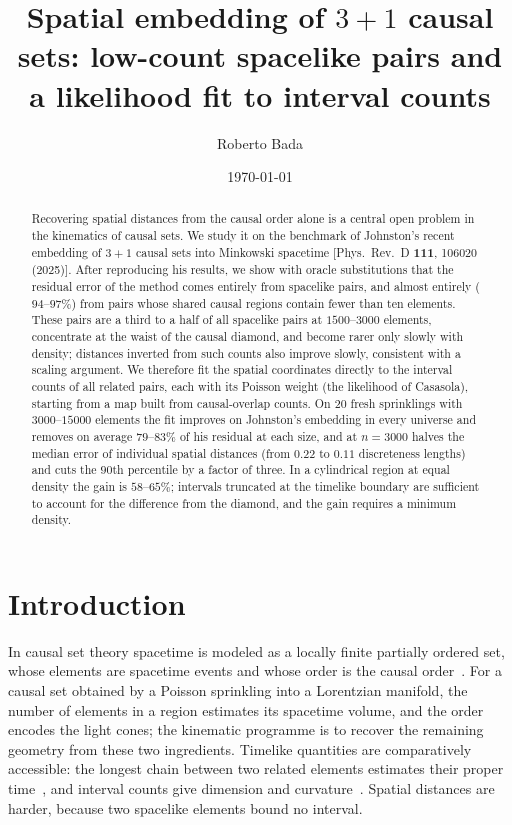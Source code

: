 \documentclass[prd,twocolumn,superscriptaddress,nofootinbib,amsmath,amssymb,floatfix]{revtex4-2}
\begin{document}
\title{Spatial embedding of $3+1$ causal sets: low-count spacelike pairs and a likelihood fit to interval counts}

\author{Roberto Bada}

\date{\today}

\begin{abstract}
Recovering spatial distances from the causal order alone is a central open problem in the kinematics of causal sets. We study it on the benchmark of Johnston's recent embedding of $3+1$ causal sets into Minkowski spacetime [Phys.\ Rev.\ D \textbf{111}, 106020 (2025)]. After reproducing his results, we show with oracle substitutions that the residual error of the method comes entirely from spacelike pairs, and almost entirely ($94$--$97\%$) from pairs whose shared causal regions contain fewer than ten elements. These pairs are a third to a half of all spacelike pairs at $1500$--$3000$ elements, concentrate at the waist of the causal diamond, and become rarer only slowly with density; distances inverted from such counts also improve slowly, consistent with a scaling argument. We therefore fit the spatial coordinates directly to the interval counts of all related pairs, each with its Poisson weight (the likelihood of Casasola), starting from a map built from causal-overlap counts. On 20 fresh sprinklings with $3000$--$15000$ elements the fit improves on Johnston's embedding in every universe and removes on average $79$--$83\%$ of his residual at each size, and at $n=3000$ halves the median error of individual spatial distances (from $0.22$ to $0.11$ discreteness lengths) and cuts the $90$th percentile by a factor of three. In a cylindrical region at equal density the gain is $58$--$65\%$; intervals truncated at the timelike boundary are sufficient to account for the difference from the diamond, and the gain requires a minimum density.
\end{abstract}

\maketitle

\section{Introduction}\label{sec:intro}
In causal set theory spacetime is modeled as a locally finite partially ordered set, whose elements are spacetime events and whose order is the causal order~\cite{BLMS87,Surya19}. For a causal set obtained by a Poisson sprinkling into a Lorentzian manifold, the number of elements in a region estimates its spacetime volume, and the order encodes the light cones; the kinematic programme is to recover the remaining geometry from these two ingredients. Timelike quantities are comparatively accessible: the longest chain between two related elements estimates their proper time~\cite{BrightwellGregory91}, and interval counts give dimension and curvature~\cite{GlaserSurya13,RSS13,BD10}. Spatial distances are harder, because two spacelike elements bound no interval.
\end{document}
